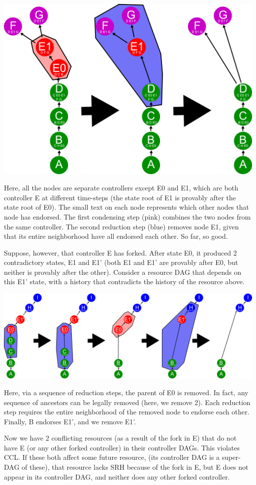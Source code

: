 \documentclass[a4paper,USenglish,cleveref, autoref, thm-restate, anonymous]{lipics-v2021}
\begin{document}
\includegraphics[width=1\linewidth]{figs/local-reduce-example-red-1.pdf}

Here, all the nodes are separate controllers except E0 and E1, which are both controller E at different time-steps (the state root of E1 is provably after the state root of E0). 
The small text on each node represents which other nodes that node has endorsed. 
The first condensing step (pink) combines the two nodes from the same controller. 
The second reduction step (blue) removes node E1, given that its entire neighborhood have all endorsed each other. 
So far, so good.

Suppose, however, that controller E has forked.
After state E0, it produced 2 contradictory states, E1 and E1' (both E1 and E1' are provably after E0, but neither is provably after the other). 
Consider a resource DAG that depends on this E1' state, with a history that contradicts the history of the resource above. 

\includegraphics[width=1\linewidth]{figs/local-reduce-example-blue-1.pdf}

Here, via a sequence of reduction steps, the parent of E0 is removed.
In fact, any sequence of ancestors can be legally removed (here, we remove 2).
Each reduction step requires the entire neighborhood of the removed node to endorse each other. 
Finally, B endorses E1', and we remove E1'.

Now we have 2 conflicting resources (as a result of the fork in E) that do not have E (or any other forked controller) in their controller DAGs.
This violates CCL. 
If these both affect some future resource, (its controller DAG is a super-DAG of these), that resource lacks SRH because of the fork in E, but E does not appear in its controller DAG, and neither does any other forked controller.
\end{document}
